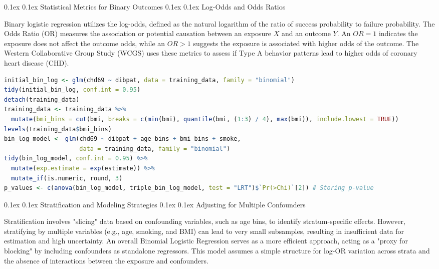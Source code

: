 \documentclass[8pt,landscape]{article}
\makeatletter
\renewcommand{\section}{\@startsection{section}{2}{0pt}%
    {0.1ex}%
    {0.1ex}%
    {\fontsize{8}{9}\bfseries\color{red}}} %
\renewcommand{\subsection}{\@startsection{subsection}{2}{0pt}%
    {0.1ex}%
    {0.1ex}%
    {\fontsize{8}{9}\bfseries\color{blue}}} %
\newcommand{\smalltext}[1]{
  {\fontsize{8}{9}\selectfont\sloppy #1\par}
}
\makeatother
\begin{document}
\begin{multicols}{3}
\section{Statistical Metrics for Binary Outcomes}
\subsection{Log-Odds and Odds Ratios}
\smalltext{
Binary logistic regression utilizes the log-odds, defined as the natural logarithm of the ratio of success probability to failure probability. The Odds Ratio (OR) measures the association or potential causation between an exposure $X$ and an outcome $Y$. An $OR = 1$ indicates the exposure does not affect the outcome odds, while an $OR > 1$ suggests the exposure is associated with higher odds of the outcome. The Western Collaborative Group Study (WCGS) uses these metrics to assess if Type A behavior patterns lead to higher odds of coronary heart disease (CHD).
}

\begin{lstlisting}[language=R]
initial_bin_log <- glm(chd69 ~ dibpat, data = training_data, family = "binomial")
tidy(initial_bin_log, conf.int = 0.95)
detach(training_data)
training_data <- training_data %>%
  mutate(bmi_bins = cut(bmi, breaks = c(min(bmi), quantile(bmi, (1:3) / 4), max(bmi)), include.lowest = TRUE))
levels(training_data$bmi_bins)
bin_log_model <- glm(chd69 ~ dibpat + age_bins + bmi_bins + smoke, 
                     data = training_data, family = "binomial")
tidy(bin_log_model, conf.int = 0.95) %>% 
  mutate(exp.estimate = exp(estimate)) %>%
  mutate_if(is.numeric, round, 3)
p_values <- c(anova(bin_log_model, triple_bin_log_model, test = "LRT")$`Pr(>Chi)`[2]) # Storing p-value
\end{lstlisting}

\section{Stratification and Modeling Strategies}
\subsection{Adjusting for Multiple Confounders}
\smalltext{
Stratification involves "slicing" data based on confounding variables, such as age bins, to identify stratum-specific effects. However, stratifying by multiple variables (e.g., age, smoking, and BMI) can lead to very small subsamples, resulting in insufficient data for estimation and high uncertainty. An overall Binomial Logistic Regression serves as a more efficient approach, acting as a "proxy for blocking" by including confounders as standalone regressors. This model assumes a simple structure for log-OR variation across strata and the absence of interactions between the exposure and confounders.
}


\end{multicols}
\end{document}
